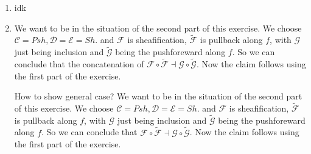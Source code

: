 \begin{exercise}{4}
\begin{enumerate}
        \item{idk}
        \item{We want to be in the situation of the second part of
             this exercise. We choose $\mathcal{C}=Psh, \mathcal{D}=\mathcal{E}=Sh$.
             and $\mathcal{F}$ is sheafification, $\mathcal{\tilde{F}}$ is pullback
             along $f$, with $\mathcal{G}$ just being inclusion and $\tilde{\mathcal{G}}$
             being the pushforeward
             along $f$. So we can conclude that the concatenation of 
             $\mathcal{F}\circ \mathcal{\tilde{F}}\dashv \mathcal{G}\circ \mathcal{\tilde{G}}$.
             Now the claim follows using the first part of the exercise.

             How to show general case?
             We want to be in the situation of the second part of
             this exercise. We choose $\mathcal{C}=Psh, \mathcal{D}=\mathcal{E}=Sh$.
             and $\mathcal{F}$ is sheafification, $\mathcal{\tilde{F}}$ is pullback
             along $f$, with $\mathcal{G}$ just being inclusion and $\tilde{\mathcal{G}}$
             being the pushforeward
             along $f$. So we can conclude that
             $\mathcal{F}\circ \mathcal{\tilde{F}}\dashv \mathcal{G}\circ
                \mathcal{\tilde{G}}$.
             Now the claim follows using the first part of the exercise.
            }
    \end{enumerate}
\end{exercise}



